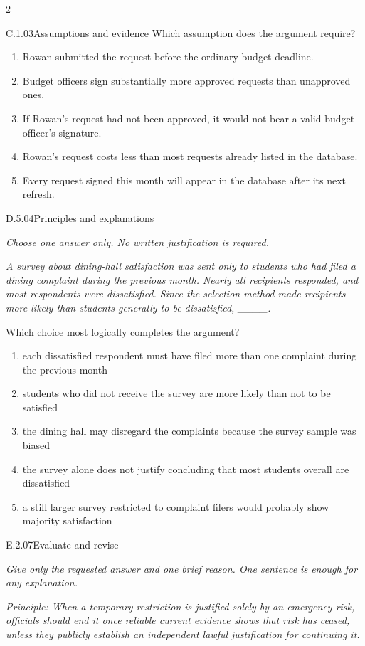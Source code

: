 \documentclass[9pt]{extarticle}
\newcommand{\choice}[1]{\item #1}
\begin{document}
\begin{multicols}{2}
\begin{DenseCoreProblem}{C.1.03}{Assumptions and evidence}
Which assumption does the argument require?
\begin{enumerate}[label=(\alph*)]
  \choice{Rowan submitted the request before the ordinary budget deadline.}
  \choice{Budget officers sign substantially more approved requests than unapproved ones.}
  \choice{If Rowan's request had not been approved, it would not bear a valid budget officer's signature.}
  \choice{Rowan's request costs less than most requests already listed in the database.}
  \choice{Every request signed this month will appear in the database after its next refresh.}
\end{enumerate}
\end{DenseCoreProblem}
\begin{DenseCoreProblem}{D.5.04}{Principles and explanations}
{\scriptsize\textit{Choose one answer only. No written justification is required.}\par}
\emph{A survey about dining-hall satisfaction was sent only to students who had filed a dining complaint during the previous month. Nearly all recipients responded, and most respondents were dissatisfied. Since the selection method made recipients more likely than students generally to be dissatisfied, \_\_\_\_.}

Which choice most logically completes the argument?
\begin{enumerate}[label=(\alph*)]
  \choice{each dissatisfied respondent must have filed more than one complaint during the previous month}
  \choice{students who did not receive the survey are more likely than not to be satisfied}
  \choice{the dining hall may disregard the complaints because the survey sample was biased}
  \choice{the survey alone does not justify concluding that most students overall are dissatisfied}
  \choice{a still larger survey restricted to complaint filers would probably show majority satisfaction}
\end{enumerate}
\end{DenseCoreProblem}
\begin{DenseCoreProblem}{E.2.07}{Evaluate and revise}
{\scriptsize\textit{Give only the requested answer and one brief reason. One sentence is enough for any explanation.}\par}
\emph{Principle: When a temporary restriction is justified solely by an emergency risk, officials should end it once reliable current evidence shows that risk has ceased, unless they publicly establish an independent lawful justification for continuing it.}


\end{DenseCoreProblem}
\end{multicols}
\end{document}
